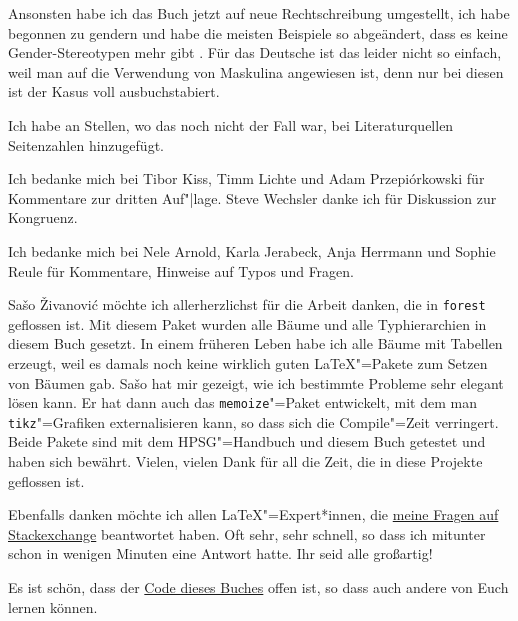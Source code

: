 Ansonsten habe ich das Buch jetzt auf neue Rechtschreibung umgestellt, ich habe begonnen zu gendern
und habe die meisten Beispiele so abgeändert, dass es keine Gender-Stereotypen mehr gibt
\citep{MB97a,PCKSDMC2017a}. Für das Deutsche ist das leider nicht so einfach, weil man auf die
Verwendung von Maskulina angewiesen ist, denn nur bei diesen ist der Kasus voll ausbuchstabiert. 

Ich habe an Stellen, wo das noch nicht der Fall war, bei Literaturquellen Seitenzahlen hinzugefügt.

Ich bedanke mich bei Tibor Kiss, Timm Lichte und Adam
Przepiórkowski für Kommentare zur dritten Auf"|lage. Steve Wechsler
danke ich für Diskussion zur Kongruenz.

Ich bedanke mich bei Nele Arnold, Karla Jerabeck, Anja Herrmann und Sophie Reule für Kommentare, Hinweise auf Typos und Fragen.

Sašo Živanović möchte ich allerherzlichst für die Arbeit danken, die in \texttt{forest} geflossen
ist. Mit diesem Paket wurden alle Bäume und alle Typhierarchien in diesem Buch gesetzt. In einem
früheren Leben habe ich alle Bäume mit Tabellen erzeugt, weil es damals noch keine wirklich guten
\LaTeX"=Pakete zum Setzen von Bäumen gab. Sašo hat mir gezeigt, wie ich bestimmte Probleme sehr
elegant lösen kann. Er hat dann auch das \texttt{memoize}"=Paket entwickelt, mit dem man \texttt{tikz}"=Grafiken
externalisieren kann, so dass sich die Compile"=Zeit verringert. Beide Pakete sind mit dem
HPSG"=Handbuch und diesem Buch getestet und haben sich bewährt. Vielen, vielen Dank für all die Zeit,
die in diese Projekte geflossen ist.

Ebenfalls danken möchte ich allen \LaTeX"=Expert*innen, die \href{https://tex.stackexchange.com/users/18561/stefan-m%c3%bcller?tab=questions}{meine Fragen auf Stackexchange}
beantwortet haben. Oft sehr, sehr schnell, so dass ich mitunter schon in wenigen Minuten eine
Antwort hatte. Ihr seid alle großartig!

Es ist schön, dass der \href{https://github.com/stefan11/HPSG-Lehrbuch}{Code dieses Buches} offen ist, so dass auch andere von Euch lernen können.


